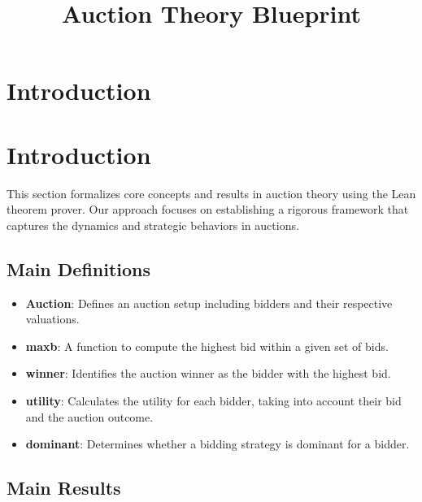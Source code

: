 \title{Auction Theory Blueprint} 




\maketitle


\tableofcontents
\section{Introduction}
\section{Introduction}

This section formalizes core concepts and results in auction theory using the Lean theorem prover. Our approach focuses on establishing a rigorous framework that captures the dynamics and strategic behaviors in auctions.

\subsection{Main Definitions}

\begin{itemize}
    \item \textbf{Auction}: Defines an auction setup including bidders and their respective valuations.
    \item \textbf{maxb}: A function to compute the highest bid within a given set of bids.
    \item \textbf{winner}: Identifies the auction winner as the bidder with the highest bid.
    \item \textbf{utility}: Calculates the utility for each bidder, taking into account their bid and the auction outcome.
    \item \textbf{dominant}: Determines whether a bidding strategy is dominant for a bidder.
\end{itemize}

\subsection{Main Results}

